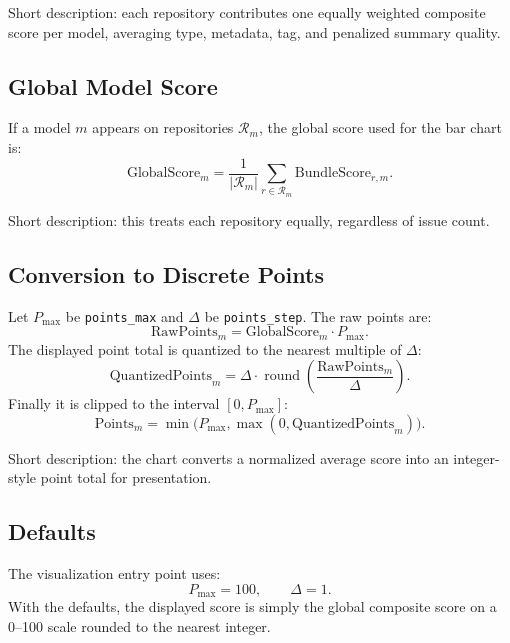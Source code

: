 \documentclass[11pt]{article}
\begin{document}
Short description: each repository contributes one equally weighted composite score per model, averaging type, metadata, tag, and penalized summary quality.

\subsection{Global Model Score}
If a model $m$ appears on repositories $\mathcal{R}_m$, the global score used for the bar chart is:
\[
\mathrm{GlobalScore}_{m}=
\frac{1}{|\mathcal{R}_m|}
\sum_{r \in \mathcal{R}_m}\mathrm{BundleScore}_{r,m}.
\]

Short description: this treats each repository equally, regardless of issue count.

\subsection{Conversion to Discrete Points}
Let $P_{\max}$ be \texttt{points\_max} and $\Delta$ be \texttt{points\_step}. The raw points are:
\[
\mathrm{RawPoints}_m = \mathrm{GlobalScore}_m \cdot P_{\max}.
\]
The displayed point total is quantized to the nearest multiple of $\Delta$:
\[
\mathrm{QuantizedPoints}_m =
\Delta \cdot \operatorname{round}\!\left(\frac{\mathrm{RawPoints}_m}{\Delta}\right).
\]
Finally it is clipped to the interval $[0,P_{\max}]$:
\[
\mathrm{Points}_m=
\min\!\bigl(P_{\max},\max(0,\mathrm{QuantizedPoints}_m)\bigr).
\]

Short description: the chart converts a normalized average score into an integer-style point total for presentation.

\subsection{Defaults}
The visualization entry point uses:
\[
P_{\max}=100,\qquad \Delta=1.
\]
With the defaults, the displayed score is simply the global composite score on a 0--100 scale rounded to the nearest integer.
\end{document}

